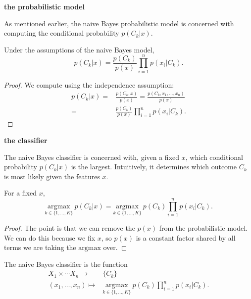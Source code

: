\documentclass[12pt]{article}
\begin{document}
\textbf{the probabilistic model}

As mentioned earlier, the naive Bayes probabilistic model is concerned with computing the conditional probability $p(C_k | x)$. 

\begin{proposition}
	Under the assumptions of the naive Bayes model, 
	\begin{equation*}
		p(C_k | x) = \frac{p(C_k)}{p(x)}\prod_{i=1}^n p(x_i | C_k).
	\end{equation*}
\end{proposition}
\begin{proof}
	We compute using the independence assumption:
	\begin{align*}
		p(C_k | x)
		=& \frac{p(C_k,x)}{p(x)} = \frac{p(C_k,x_1,\dots,x_n)}{p(x)} \\
		=& \frac{p(C_k)}{p(x)}\prod_{i=1}^n p(x_i | C_k).
	\end{align*}
\end{proof}

\textbf{the classifier}

The naive Bayes classifier is concerned with, given a fixed $x$, which conditional probability $p(C_k|x)$ is the largest. Intuitively, it determines which outcome $C_k$ is most likely given the features $x$. 

\begin{proposition}
	For a fixed $x$, 
	\begin{equation*}
		\underset{k\in\{1,\dots,K\}}{\text{argmax}}\ p(C_k|x) = \underset{k\in\{1,\dots,K\}}{\text{argmax}}\ p(C_k)\prod_{i=1}^n p(x_i|C_k).
	\end{equation*}
\end{proposition}
\begin{proof}
	The point is that we can remove the $p(x)$ from the probabilistic model. We can do this because we fix $x$, so $p(x)$ is a constant factor shared by all terms we are taking the $\text{argmax}$ over.
\end{proof}

\begin{definition}
	The naive Bayes classifier is the function 
	\begin{align*}
		X_1\times \cdots X_n \to& \{C_k\} \\
		(x_1,\dots,x_n) \mapsto& \underset{k\in\{1,\dots,K\}}{\text{argmax}}\ p(C_k)\prod_{i=1}^n p(x_i|C_k).
	\end{align*}
\end{definition}
\end{document}
